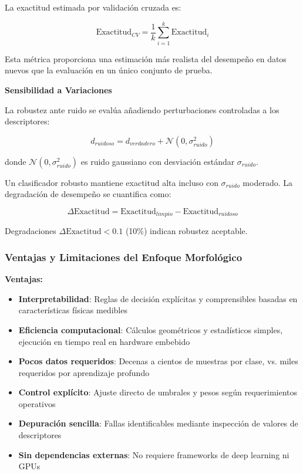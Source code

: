 La exactitud estimada por validación cruzada es:

\begin{equation}
\text{Exactitud}_{CV} = \frac{1}{k}\sum_{i=1}^{k} \text{Exactitud}_i
\end{equation}

Esta métrica proporciona una estimación más realista del desempeño en datos nuevos que la evaluación en un único conjunto de prueba.

\textbf{Sensibilidad a Variaciones}

La robustez ante ruido se evalúa añadiendo perturbaciones controladas a los descriptores:

\begin{equation}
d_{ruidoso} = d_{verdadero} + \mathcal{N}(0, \sigma_{ruido}^2)
\end{equation}

donde $\mathcal{N}(0, \sigma_{ruido}^2)$ es ruido gaussiano con desviación estándar $\sigma_{ruido}$.

Un clasificador robusto mantiene exactitud alta incluso con $\sigma_{ruido}$ moderado. La degradación de desempeño se cuantifica como:

\begin{equation}
\Delta\text{Exactitud} = \text{Exactitud}_{limpio} - \text{Exactitud}_{ruidoso}
\end{equation}

Degradaciones $\Delta\text{Exactitud} < 0.1$ (10\%) indican robustez aceptable.

\subsubsection{Ventajas y Limitaciones del Enfoque Morfológico}

\textbf{Ventajas:}
\begin{itemize}
\item \textbf{Interpretabilidad}: Reglas de decisión explícitas y comprensibles basadas en características físicas medibles
\item \textbf{Eficiencia computacional}: Cálculos geométricos y estadísticos simples, ejecución en tiempo real en hardware embebido
\item \textbf{Pocos datos requeridos}: Decenas a cientos de muestras por clase, vs. miles requeridos por aprendizaje profundo
\item \textbf{Control explícito}: Ajuste directo de umbrales y pesos según requerimientos operativos
\item \textbf{Depuración sencilla}: Fallas identificables mediante inspección de valores de descriptores
\item \textbf{Sin dependencias externas}: No requiere frameworks de deep learning ni GPUs
\end{itemize}

